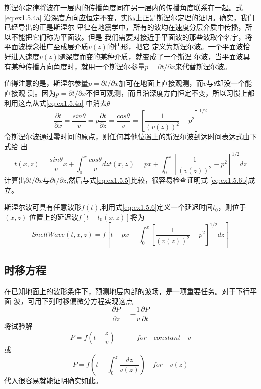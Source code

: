 斯涅尔定律将波在一层内的传播角度同在另一层内的传播角度联系在一起。式\ref{eq:ex1.5.4a}
沿深度方向应恒定不变，实际上正是斯涅尔定理的证明。确实，我们已经导出的正是斯涅尔
卑律在地震学中，所有的波均在速度分层介质中传播，所以不能把它们称为平面波。但是
我们需要对接近于平面波的那些波取个名宇，将平面波概念推广至成层介质$v(z)$的情形，把它
定义为斯涅尔波。一个平面波恰好进入速度$v(z)$随深度而变的某种介质，就变成了一个斯涅
尔波，当平面波具有某种传播方向角度时，就用一个斯涅尔参量$p=\partial t/\partial x$来代替斯涅尔波。

值得注意的是，斯涅尔参量$p=\partial t/\partial x$加可在地面上直接观测，而$v$与$\theta$却没一个能直接观
测。因为$p=\partial t/\partial x$不但可观测，而且沿深度方向恒定不变，所以习惯上都利用这点从式\ref{eq:ex1.5.4a}
中消去$\theta$
\begin{subequations}\label{eq:ex1.5.5}
\begin{equation}
\frac{\partial t}{\partial x}=\frac{sin\theta}{v}=p
\label{eq:ex1.5.5a}
\end{equation}
\begin{equation}
\frac{\partial t}{\partial z}=\frac{cos\theta}{v}=[\frac{1}{(v(z))^2}-p^2]^{1/2}
\label{eq:ex1.5.5b}
\end{equation}
\end{subequations}
令斯涅尔波通过零时间的原点，则任何其他位置上的斯涅尔波到达时间表达式由下式给
出
\begin{subequations}\label{eq:ex1.5.6}
\begin{equation}
t(x,z)=\frac{sin\theta}{v}x+\int_0^x\frac{cos\theta}{v}dz
\label{eq:ex1.5.6a}
\end{equation}
\begin{equation}
t(x,z)=px+\int_0^x[\frac{1}{(v(z))^2}-p^2]^{1/2}dz
\label{eq:ex1.5.6b}
\end{equation}
\end{subequations}
计算出$\partial t/\partial x$与$\partial t/\partial z$,然后与式\ref{eq:ex1.5.5}比较，很容易检查证明式
\ref{eq:ex1.5.6b}成立。

斯涅尔波可具有任意波形$f(t)$,利用式\ref{eq:ex1.5.6}定义一个延迟时间$t_0$，则位于$(x,z)$
位置上的延迟波$f[t-t_0(x,z)]$将为
\begin{equation}
SnellWave(t,x,z)=f[t-px-\int_0^x[\frac{1}{(v(z))^2}-p^2]^{1/2}dz]
\label{eq:ex1.5.7}
\end{equation}
\subsection{时移方程}
在已知地面上的波形条件下，预测地层内部的波场，是一项重要任务。对于下行平面
波，可用下列时移偏微分方程实现这点
\begin{equation}
\frac{\partial P}{\partial z}=-\frac{1}{v}\frac{\partial P}{\partial t}
\label{eq:ex1.5.8}
\end{equation}
将试验解
\begin{equation}
P=f(t-\frac{z}{v})  \quad\quad\quad for\quad constant\quad v
\label{eq:ex1.5.9}
\end{equation}
或
\begin{equation}
P=f(t-\int_0^z\frac{dz}{v(z)})  \quad for\quad v(z)
\label{eq:ex1.5.10}
\end{equation}
代入很容易就能证明确实如此。

